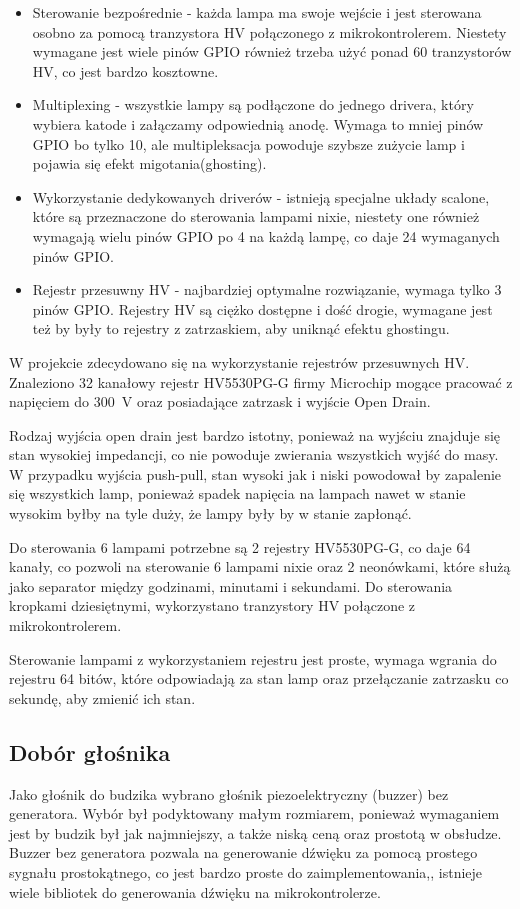 \documentclass[../main.tex]{subfiles}
\begin{document}
\begin{itemize}
    \item Sterowanie bezpośrednie - każda lampa ma swoje wejście i jest sterowana osobno za pomocą tranzystora HV połączonego z mikrokontrolerem.
    Niestety wymagane jest wiele pinów GPIO również trzeba użyć ponad 60 tranzystorów HV, co jest bardzo kosztowne.
    \item Multiplexing - wszystkie lampy są podłączone do jednego drivera, który wybiera katode i załączamy odpowiednią anodę. 
    Wymaga to mniej pinów GPIO bo tylko 10, ale multipleksacja powoduje szybsze zużycie lamp i pojawia się efekt migotania(ghosting).
    \item Wykorzystanie dedykowanych driverów - istnieją specjalne układy scalone, które są przeznaczone do sterowania lampami nixie, niestety
    one również wymagają wielu pinów GPIO po 4 na każdą lampę, co daje 24 wymaganych pinów GPIO.
    \item Rejestr przesuwny HV - najbardziej optymalne rozwiązanie, wymaga tylko 3 pinów GPIO. Rejestry HV są ciężko dostępne i dość drogie,
    wymagane jest też by były to rejestry z zatrzaskiem, aby uniknąć efektu ghostingu.
\end{itemize}

W projekcie zdecydowano się na wykorzystanie rejestrów przesuwnych HV. Znaleziono 32 kanałowy rejestr 
HV5530PG-G firmy Microchip mogące pracować z napięciem do \SI{300}{\volt} oraz posiadające zatrzask i wyjście Open Drain.

Rodzaj wyjścia open drain jest bardzo istotny, ponieważ na wyjściu znajduje się stan wysokiej impedancji, co nie powoduje zwierania wszystkich wyjść do masy.
W przypadku wyjścia push-pull, stan wysoki jak i niski powodował by zapalenie się wszystkich lamp, ponieważ spadek napięcia na lampach
nawet w stanie wysokim byłby na tyle duży, że lampy były by w stanie zapłonąć.

Do sterowania 6 lampami potrzebne są 2 rejestry HV5530PG-G, co daje 64 kanały, co pozwoli na sterowanie 6 lampami nixie oraz 2 neonówkami, które
służą jako separator między godzinami, minutami i sekundami. Do sterowania kropkami dziesiętnymi, wykorzystano tranzystory HV połączone z mikrokontrolerem.

Sterowanie lampami z wykorzystaniem rejestru jest proste, wymaga wgrania do rejestru 64 bitów, które odpowiadają za stan lamp oraz przełączanie
zatrzasku co sekundę, aby zmienić ich stan.

\subsection{Dobór głośnika}
Jako głośnik do budzika wybrano głośnik piezoelektryczny (buzzer) bez generatora. Wybór był podyktowany 
małym rozmiarem, ponieważ wymaganiem jest by budzik był jak najmniejszy, a także niską ceną oraz prostotą w obsłudze.
Buzzer bez generatora pozwala na generowanie dźwięku za pomocą prostego sygnału prostokątnego,
co jest bardzo proste do zaimplementowania,, istnieje wiele bibliotek do generowania dźwięku na mikrokontrolerze.
\end{document}
